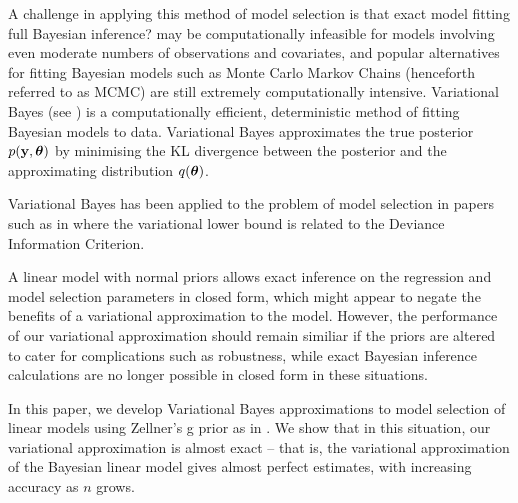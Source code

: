\documentclass{amsart}[12pt]
\newcommand{\mgc}[1]{{\color{blue}#1}}
\begin{document}


A challenge in applying this method of model selection is that exact model fitting \mgc{full Bayesian
inference?} may be computationally infeasible for models involving even moderate numbers of observations and
covariates, and popular alternatives for fitting Bayesian models such as Monte Carlo Markov Chains (henceforth
referred to as MCMC) are still extremely computationally intensive. Variational Bayes (see
\citep{Ormerod2010}) is a computationally efficient, deterministic method of fitting Bayesian models to data.
Variational Bayes approximates the true posterior $p({\bf y}, {\boldsymbol \theta})$ by minimising the KL divergence between
the posterior and the  approximating distribution $q({\boldsymbol \theta})$.

Variational Bayes has been applied to the problem of model selection in papers such as in \citep{McGrory2007}
where the variational lower bound is related to the Deviance Information Criterion.

A linear model with normal priors allows exact inference on the regression and model selection parameters in
closed form, which might appear to negate the benefits of a variational approximation to the model. However,
the performance of our variational approximation should remain similiar if the priors are altered to cater for
complications such as robustness, while exact Bayesian inference calculations are no longer possible in closed
form in these situations.






In this paper, we develop Variational Bayes approximations to model selection of linear models using Zellner's
g prior as in \citep{Liang2008}. We show that in this situation, our variational approximation is almost exact
-- that is, the variational approximation of the Bayesian linear model gives almost perfect estimates, with
increasing accuracy as $n$ grows.

\end{document}
